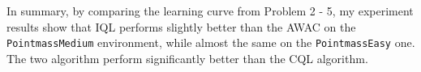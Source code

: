 \documentclass[10pt, letterpaper]{article}
\begin{document}
In summary, by comparing the learning curve from Problem 2 - 5, my experiment results show that IQL performs slightly better than the AWAC on the \texttt{PointmassMedium} environment, while almost the same on the \texttt{PointmassEasy} one. The two algorithm perform significantly better than the CQL algorithm.
\end{document}
